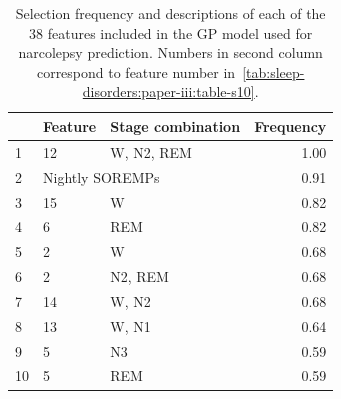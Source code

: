 \begin{table}
    \small
    \begin{threeparttable}
    \caption[Narcolepsy features selection frequencies]{Selection frequency and descriptions of each of the 38 features included in the \acl{GP} model used for narcolepsy prediction. Numbers in second column correspond to feature number in~\cref{tab:sleep-disorders:paper-iii:table-s10}.}
    \label{tab:paperiii-supptable05}
    \begin{tabular}{@{}lp{6cm}lr@{}}
        \toprule
           & \textbf{Feature}                                                & \textbf{Stage combination}  & \textbf{Frequency} \\ \midrule
        1  & 12                                                     & \ac{W}, \ac{N2}, \ac{REM}             & 1.00                         \\
        2  & \multicolumn{2}{l}{Nightly \acp{SOREMP}}                                                       & 0.91                         \\
        3  & 15                                                     & \ac{W}                                & 0.82                         \\
        4  & 6                                                      & \ac{REM}                              & 0.82                         \\
        5  & 2                                                      & \ac{W}                                & 0.68                         \\
        6  & 2                                                      & \ac{N2}, \ac{REM}                     & 0.68                         \\
        7  & 14                                                     & \ac{W}, \ac{N2}                       & 0.68                         \\
        8  & 13                                                     & \ac{W}, \ac{N1}                       & 0.64                         \\
        9  & 5                                                      & \ac{N3}                               & 0.59                         \\
        10 & 5                                                      & \ac{REM}                              & 0.59                         \\

\end{tabular}
\end{threeparttable}
\end{table}
